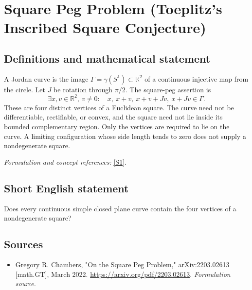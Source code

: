 \documentclass[11pt]{article}
\begin{document}
\section*{\texorpdfstring{Square Peg Problem (Toeplitz's Inscribed Square Conjecture)}{Square Peg Problem (Toeplitz's Inscribed Square Conjecture)}}\label{489}
\subsection{Definitions and mathematical statement}
A Jordan curve is the image $\Gamma=\gamma(S^1)\subset{\mathbb{R}}^2$ of a continuous injective map from the circle. Let $J$ be rotation through $\pi/2$. The square-peg assertion is
\[
 \exists x,v\in{\mathbb{R}}^2,\ v\ne0:\quad
 x,\ x+v,\ x+v+Jv,\ x+Jv\in\Gamma.
\]
These are four distinct vertices of a Euclidean square. The curve need not be differentiable, rectifiable, or convex, and the square need not lie inside its bounded complementary region. Only the vertices are required to lie on the curve. A limiting configuration whose side length tends to zero does not supply a nondegenerate square.
\par\smallskip\textit{Formulation and concept references:} \href{https://arxiv.org/pdf/2203.02613}{[S1]}.

\subsection{Short English statement}
Does every continuous simple closed plane curve contain the four vertices of a nondegenerate square?
\subsection{Sources}
\begin{itemize}
\item[S1]Gregory R. Chambers, "On the Square Peg Problem," arXiv:2203.02613 [math.GT], March 2022.
\url{https://arxiv.org/pdf/2203.02613}.
\textit{Formulation source.}
\end{itemize}
\end{document}
